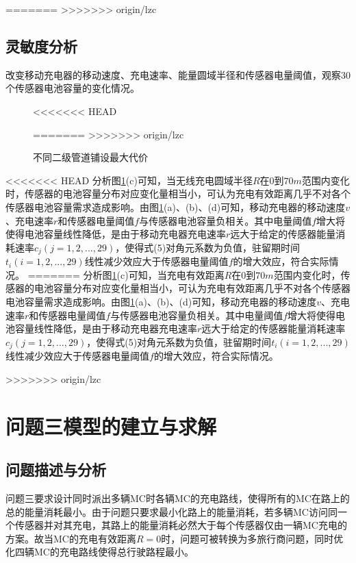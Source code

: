 \documentclass{whutmod}
\begin{document}
\begin{table}[H]
\begin{tablenotes}
=======
>>>>>>> origin/lzc
        \subsection{灵敏度分析}

		改变移动充电器的移动速度、充电速率、能量圆域半径和传感器电量阈值，观察$30$个传感器电池容量的变化情况。
		
	\begin{figure}[H]
		\centering
<<<<<<< HEAD

=======
>>>>>>> origin/lzc
	\end{figure}	
	\begin{figure}[H]
		\centering
		\caption{不同二级管道铺设最大代价}
		\label{mgh}
	\end{figure}
<<<<<<< HEAD
		分析图\ref{mgh}(c)可知，当无线充电圆域半径$R$在$0$到$70m$范围内变化时，传感器的电池容量分布对应变化量相当小，可认为充电有效距离几乎不对各个传感器电池容量需求造成影响。由图\ref{mgh}(a)、(b)、(d)可知，移动充电器的移动速度$v$、充电速率$r$和传感器电量阈值$f$与传感器电池容量负相关。其中电量阈值$f$增大将使得电池容量线性降低，是由于移动充电器充电速率$r$远大于给定的传感器能量消耗速率$c_j(j=1,2,...,29)$，使得式(5)对角元系数为负值，驻留期时间$t_i(i=1,2,...,29)$线性减少效应大于传感器电量阈值$f$的增大效应，符合实际情况。
=======
		分析图\ref{mgh}(c)可知，当充电有效距离$R$在$0$到$70m$范围内变化时，传感器的电池容量分布对应变化量相当小，可认为充电有效距离几乎不对各个传感器电池容量需求造成影响。由图\ref{mgh}(a)、(b)、(d)可知，移动充电器的移动速度$v$、充电速率$r$和传感器电量阈值$f$与传感器电池容量负相关。其中电量阈值$f$增大将使得电池容量线性降低，是由于移动充电器充电速率$r$远大于给定的传感器能量消耗速率$c_j(j=1,2,...,29)$，使得式(5)对角元系数为负值，驻留期时间$t_i(i=1,2,...,29)$线性减少效应大于传感器电量阈值$f$的增大效应，符合实际情况。

>>>>>>> origin/lzc

    \section{问题三模型的建立与求解}
    \subsection{问题描述与分析}
    问题三要求设计同时派出多辆MC时各辆MC的充电路线，使得所有的MC在路上的总的能量消耗最小。由于问题只要求最小化路上的能量消耗，若多辆MC访问同一个传感器并对其充电，其路上的能量消耗必然大于每个传感器仅由一辆MC充电的方案。故当MC的充电有效距离$R=0$时，问题可被转换为多旅行商问题，同时优化四辆MC的充电路线使得总行驶路程最小。
    

\end{tablenotes}
\end{table}
\end{document}
